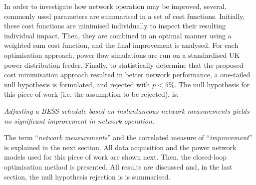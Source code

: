 In order to investigate how network operation may be improved, several, commonly used parameters are summarised in a set of cost functions.
Initially, these cost functions are minimised individually to inspect their resulting individual impact.
Then, they are combined in an optimal manner using a weighted sum cost function, and the final improvement is analysed.
For each optimisation approach, power flow simulations are run on a standardised UK power distribution feeder.
Finally, to statistically determine that the proposed cost minimisation approach resulted in better network performance, a one-tailed null hypothesis is formulated, and rejected with $p<5\%$.
The null hypothesis for this piece of work (i.e. the assumption to be rejected), is:

\textit{Adjusting a BESS schedule based on instantaneous network measurements yields no significant improvement in network operation.}

The term ``\textit{network measurements}'' and the correlated measure of ``\textit{improvement}'' is explained in the next section.
All data acquisition and the power network models used for this piece of work are shown next.
Then, the closed-loop optimisation method is presented.
All results are discussed and, in the last section, the null hypothesis rejection is is summarised.

